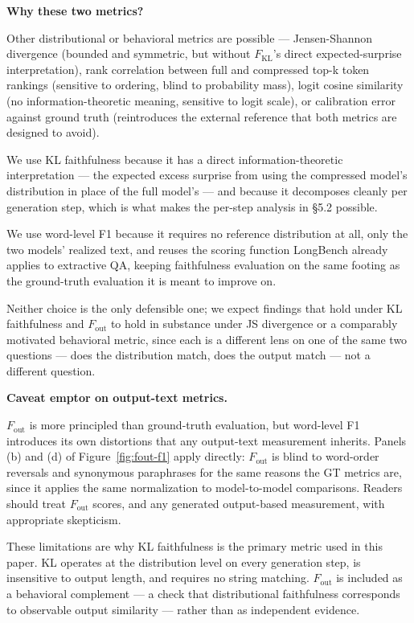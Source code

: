 \documentclass[10pt,letterpaper]{article}
\begin{document}
\textbf{Why these two metrics?}

Other distributional or behavioral
metrics are possible --- Jensen-Shannon divergence (bounded and
symmetric, but without \(F_{\text{KL}}\)'s direct expected-surprise
interpretation), rank correlation between full and compressed top-k
token rankings (sensitive to ordering, blind to probability mass), logit
cosine similarity (no information-theoretic meaning, sensitive to logit
scale), or calibration error against ground truth (reintroduces the
external reference that both metrics are designed to avoid).

We use KL faithfulness because it has a direct information-theoretic
interpretation --- the expected excess surprise from using the
compressed model's distribution in place of the full model's --- and
because it decomposes cleanly per generation step, which is what makes
the per-step analysis in §5.2 possible.

We use word-level F1 because it requires no reference distribution at
all, only the two models' realized text, and reuses the scoring function
LongBench already applies to extractive QA, keeping faithfulness
evaluation on the same footing as the ground-truth evaluation it is
meant to improve on.

Neither choice is the only defensible one; we
expect findings that hold under KL faithfulness and \(F_{\text{out}}\)
to hold in substance under JS divergence or a comparably motivated
behavioral metric, since each is a different lens on one of the same two
questions --- does the distribution match, does the output match --- not
a different question.

\textbf{Caveat emptor on output-text metrics.}

\nopagebreak
\(F_{\text{out}}\) is more principled than ground-truth evaluation, but word-level F1
introduces its own distortions that any output-text measurement
inherits. Panels (b) and (d) of Figure~\ref{fig:fout-f1} apply directly:
\(F_{\text{out}}\) is blind to word-order reversals and synonymous paraphrases for
the same reasons the GT metrics are, since it applies the same normalization to
model-to-model comparisons. Readers should treat \(F_{\text{out}}\) scores, and any
generated output-based measurement, with appropriate skepticism.


These limitations are why KL faithfulness is the primary metric used in
this paper. KL operates at the distribution level on every generation
step, is insensitive to output length, and requires no string matching.
\(F_{\text{out}}\) is included as a behavioral complement --- a check
that distributional faithfulness corresponds to observable output
similarity --- rather than as independent evidence.
\end{document}
